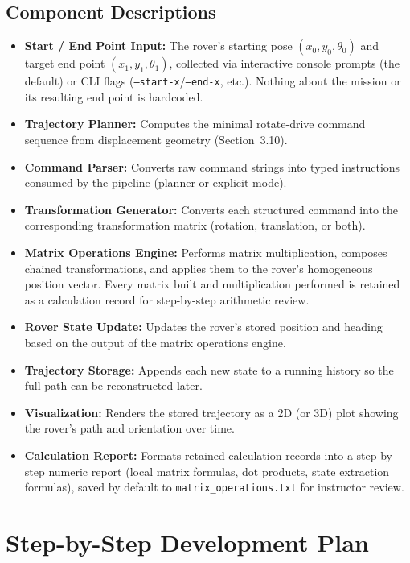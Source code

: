 \documentclass[12pt]{report}
\begin{document}
\section{Component Descriptions}
\begin{itemize}
\item \textbf{Start / End Point Input:} The rover's starting pose $(x_0, y_0, \theta_0)$ and target end point $(x_1, y_1, \theta_1)$, collected via interactive console prompts (the default) or CLI flags (\texttt{--start-x}/\texttt{--end-x}, etc.). Nothing about the mission or its resulting end point is hardcoded.
\item \textbf{Trajectory Planner:} Computes the minimal rotate-drive command sequence from displacement geometry (Section~3.10).
\item \textbf{Command Parser:} Converts raw command strings into typed instructions consumed by the pipeline (planner or explicit mode).
\item \textbf{Transformation Generator:} Converts each structured command into the corresponding transformation matrix (rotation, translation, or both).
\item \textbf{Matrix Operations Engine:} Performs matrix multiplication, composes chained transformations, and applies them to the rover's homogeneous position vector. Every matrix built and multiplication performed is retained as a calculation record for step-by-step arithmetic review.
\item \textbf{Rover State Update:} Updates the rover's stored position and heading based on the output of the matrix operations engine.
\item \textbf{Trajectory Storage:} Appends each new state to a running history so the full path can be reconstructed later.
\item \textbf{Visualization:} Renders the stored trajectory as a 2D (or 3D) plot showing the rover's path and orientation over time.
\item \textbf{Calculation Report:} Formats retained calculation records into a step-by-step numeric report (local matrix formulas, dot products, state extraction formulas), saved by default to \texttt{matrix\_operations.txt} for instructor review.
\end{itemize}

\chapter{Step-by-Step Development Plan}
\end{document}
